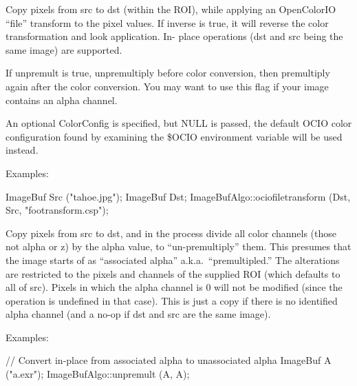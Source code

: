  
Copy pixels from {\cf src} to {\cf dst} (within the ROI), while applying an
OpenColorIO ``file'' transform to the pixel values. If {\cf inverse} is {\cf
true}, it will reverse the color transformation and look application. In-
place operations ({\cf dst} and {\cf src} being the same image) are
supported.

If {\cf unpremult} is {\cf true}, unpremultiply before color conversion,
then premultiply again after the color conversion.  You may want to use
this flag if your image contains an alpha channel.

An optional {\cf ColorConfig} is specified, but {\cf NULL} is passed, the
default OCIO color configuration found by examining the {\cf \$OCIO}
environment variable will be used instead.

\smallskip
\noindent Examples:
\begin{code}
    ImageBuf Src ("tahoe.jpg");
    ImageBuf Dst;
    ImageBufAlgo::ociofiletransform (Dst, Src, "footransform.csp");
\end{code}
\apiend


 
Copy pixels from {\cf src} to {\cf dst}, and in the process 
divide all color channels (those not alpha or z) 
by the alpha value, to ``un-premultiply'' them.  This presumes that the
image starts of as ``associated alpha'' a.k.a.\ ``premultipled.''  The
alterations are restricted to the pixels and channels of the supplied
ROI (which defaults to all of {\cf src}).  Pixels in which the alpha
channel is 0 will not be modified (since the operation is undefined in
that case).  This is just a copy if there is no identified alpha channel
(and a no-op if {\cf dst} and {\cf src} are the same image).

\smallskip
\noindent Examples:
\begin{code}
    // Convert in-place from associated alpha to unassociated alpha
    ImageBuf A ("a.exr");
    ImageBufAlgo::unpremult (A, A);
\end{code}
\apiend

